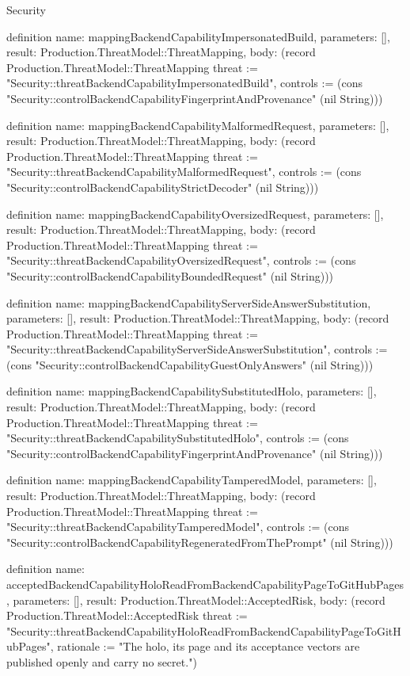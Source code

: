 \begin{lexlean}{Security}
\begin{semanticmodule}
definition{
  name: mappingBackendCapabilityImpersonatedBuild,
  parameters: [],
  result: Production.ThreatModel::ThreatMapping,
  body: (record Production.ThreatModel::ThreatMapping {threat := "Security::threatBackendCapabilityImpersonatedBuild", controls := (cons "Security::controlBackendCapabilityFingerprintAndProvenance" (nil String))})
}

definition{
  name: mappingBackendCapabilityMalformedRequest,
  parameters: [],
  result: Production.ThreatModel::ThreatMapping,
  body: (record Production.ThreatModel::ThreatMapping {threat := "Security::threatBackendCapabilityMalformedRequest", controls := (cons "Security::controlBackendCapabilityStrictDecoder" (nil String))})
}

definition{
  name: mappingBackendCapabilityOversizedRequest,
  parameters: [],
  result: Production.ThreatModel::ThreatMapping,
  body: (record Production.ThreatModel::ThreatMapping {threat := "Security::threatBackendCapabilityOversizedRequest", controls := (cons "Security::controlBackendCapabilityBoundedRequest" (nil String))})
}

definition{
  name: mappingBackendCapabilityServerSideAnswerSubstitution,
  parameters: [],
  result: Production.ThreatModel::ThreatMapping,
  body: (record Production.ThreatModel::ThreatMapping {threat := "Security::threatBackendCapabilityServerSideAnswerSubstitution", controls := (cons "Security::controlBackendCapabilityGuestOnlyAnswers" (nil String))})
}

definition{
  name: mappingBackendCapabilitySubstitutedHolo,
  parameters: [],
  result: Production.ThreatModel::ThreatMapping,
  body: (record Production.ThreatModel::ThreatMapping {threat := "Security::threatBackendCapabilitySubstitutedHolo", controls := (cons "Security::controlBackendCapabilityFingerprintAndProvenance" (nil String))})
}

definition{
  name: mappingBackendCapabilityTamperedModel,
  parameters: [],
  result: Production.ThreatModel::ThreatMapping,
  body: (record Production.ThreatModel::ThreatMapping {threat := "Security::threatBackendCapabilityTamperedModel", controls := (cons "Security::controlBackendCapabilityRegeneratedFromThePrompt" (nil String))})
}

definition{
  name: acceptedBackendCapabilityHoloReadFromBackendCapabilityPageToGitHubPages,
  parameters: [],
  result: Production.ThreatModel::AcceptedRisk,
  body: (record Production.ThreatModel::AcceptedRisk {threat := "Security::threatBackendCapabilityHoloReadFromBackendCapabilityPageToGitHubPages", rationale := "The holo, its page and its acceptance vectors are published openly and carry no secret."})
}


\end{semanticmodule}
\end{lexlean}
